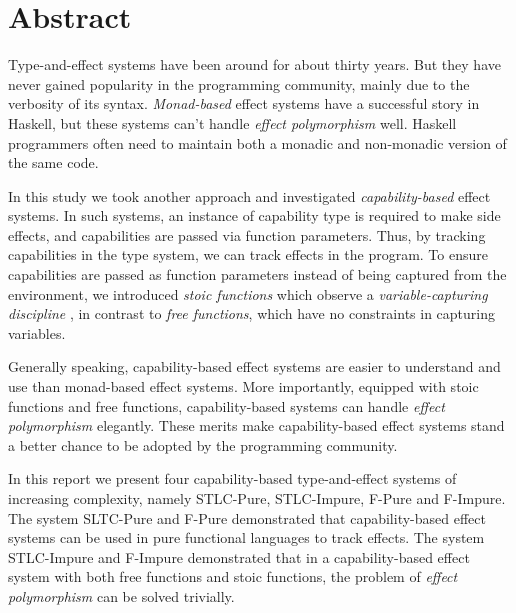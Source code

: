 \section*{\centering Abstract}

Type-and-effect systems have been around for about thirty years. But
they have never gained popularity in the programming community, mainly
due to the verbosity of its syntax. \emph{Monad-based} effect systems
have a successful story in Haskell, but these systems can't handle
\emph{effect polymorphism} well.  Haskell programmers often need to
maintain both a monadic and non-monadic version of the same code.

In this study we took another approach and investigated
\emph{capability-based} effect systems. In such systems, an instance
of capability type is required to make side effects, and capabilities
are passed via function parameters. Thus, by tracking capabilities in
the type system, we can track effects in the program. To ensure
capabilities are passed as function parameters instead of being
captured from the environment, we introduced \emph{stoic functions}
which observe a \emph{variable-capturing discipline} , in contrast to
\emph{free functions}, which have no constraints in capturing
variables.

Generally speaking, capability-based effect systems are easier to
understand and use than monad-based effect systems. More importantly,
equipped with stoic functions and free functions, capability-based
systems can handle \emph{effect polymorphism} elegantly. These merits
make capability-based effect systems stand a better chance to be
adopted by the programming community.

In this report we present four capability-based type-and-effect
systems of increasing complexity, namely STLC-Pure, STLC-Impure,
F-Pure and F-Impure.  The system SLTC-Pure and F-Pure demonstrated
that capability-based effect systems can be used in pure functional
languages to track effects. The system STLC-Impure and F-Impure
demonstrated that in a capability-based effect system with both free
functions and stoic functions, the problem of \emph{effect
  polymorphism} can be solved trivially.
